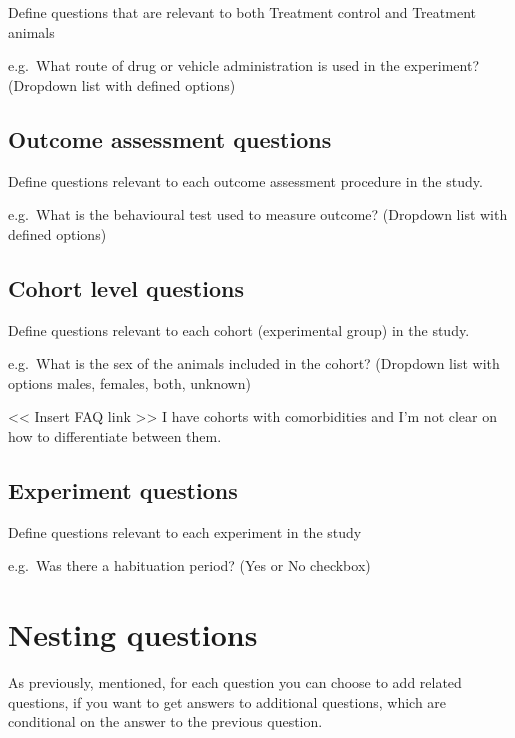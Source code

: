 \documentclass[
]{book}
\begin{document}
Define questions that are relevant to both Treatment control and Treatment animals

e.g.~What route of drug or vehicle administration is used in the experiment?
(Dropdown list with defined options)

\hypertarget{outcome-assessment-questions}{%
\subsection{Outcome assessment questions}\label{outcome-assessment-questions}}

Define questions relevant to each outcome assessment procedure in the study.

e.g.~What is the behavioural test used to measure outcome?
(Dropdown list with defined options)

\hypertarget{cohort-level-questions}{%
\subsection{Cohort level questions}\label{cohort-level-questions}}

Define questions relevant to each cohort (experimental group) in the study.

e.g.~What is the sex of the animals included in the cohort?
(Dropdown list with options males, females, both, unknown)

\textless{}\textless{} Insert FAQ link \textgreater{}\textgreater{}
I have cohorts with comorbidities and I'm not clear on how to differentiate between them.

\hypertarget{experiment-questions}{%
\subsection{Experiment questions}\label{experiment-questions}}

Define questions relevant to each experiment in the study

e.g.~Was there a habituation period?
(Yes or No checkbox)

\hypertarget{nesting-questions}{%
\section{Nesting questions}\label{nesting-questions}}

As previously, mentioned, for each question you can choose to add related questions, if you want to get answers to additional questions, which are conditional on the answer to the previous question.
\end{document}
